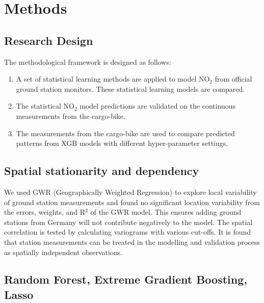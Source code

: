 \documentclass{article}
\begin{document}
\section{Methods}

\subsection{Research Design}
The methodological framework is designed as follows: 
\begin{enumerate}
    \item A set of statistical learning methods are applied to model NO$_2$ from official ground station monitors. These statistical learning models are compared.  
    
    \item The statistical NO$_2$ model predictions are validated on the continuous measurements from the cargo-bike.
    
    \item The measurements from the cargo-bike are used to compare predicted patterns from XGB models with different hyper-parameter settings. 
    
\end{enumerate} 


\subsection{Spatial stationarity and dependency}
We used GWR (Geographically Weighted Regression) to explore local variability of ground station measurements and found no significant location variability from the errors, weights, and R$^2$ of the GWR model.  This ensures adding ground stations from Germany will not contribute negatively to the model. The spatial correlation is tested by calculating variograms with various cut-offs. It is found that station measurements can be treated in the modelling and validation process as spatially independent observations.


\subsection{Random Forest, Extreme Gradient Boosting, Lasso}
\end{document}
